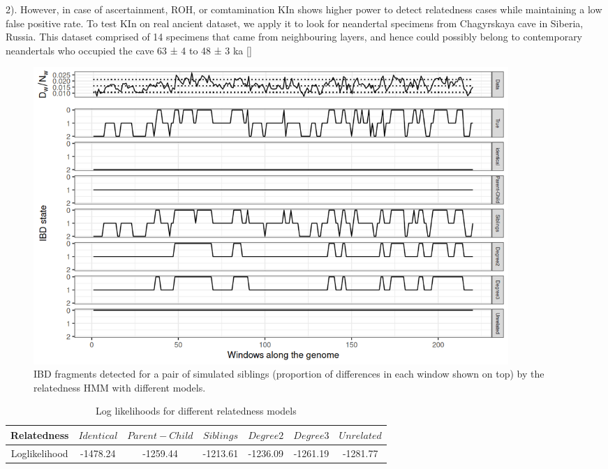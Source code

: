 \documentclass[12pt, letterpaper]{article}
\begin{document}
2). However, in case of ascertainment, ROH, or comtamination KIn shows higher power to detect relatedness cases while maintaining a low false positive rate. To test KIn on real ancient dataset, we apply it to look for neandertal specimens from Chagyrskaya cave in Siberia, Russia. This dataset comprised of 14 specimens that came from neighbouring layers, and hence could possibly belong to contemporary neandertals who occupied the cave 63 ± 4 to 48 ± 3 ka [\cite{}]

\begin{figure}[htp]
    \centering
    \includegraphics[width=18cm]{IBDplot.png}
    \caption{IBD fragments detected for a pair of simulated siblings (proportion of differences in each window shown on top) by the relatedness HMM with different models.}
    \label{fig:ibd}
\end{figure}




\begin{table}
\caption{\label{tab:Table 3}Log likelihoods for different relatedness models}
\begin{tabular}{|c|c|c|c|c|c|c|}
    \hline
    Relatedness & $Identical$ & $Parent-Child$ & $Siblings$ & $Degree2$ & $Degree3$ & $Unrelated$\\
    \hline
    Loglikelihood & -1478.24 & -1259.44 & -1213.61 & -1236.09 & -1261.19 & -1281.77\\
    \hline
   
\end{tabular}

\end{table}
\end{document}
